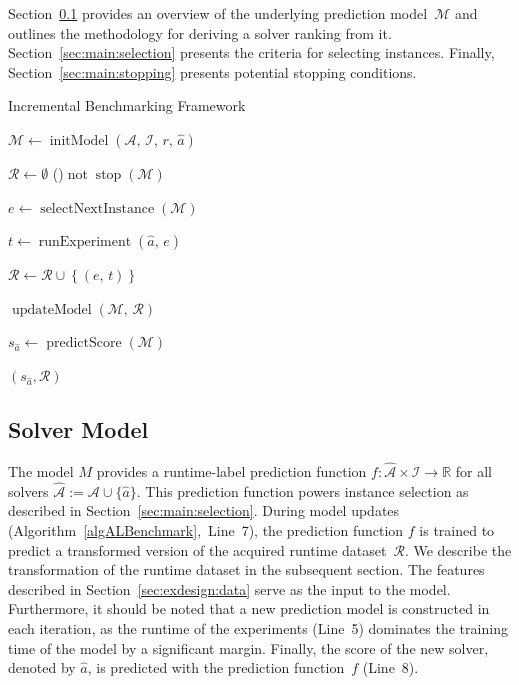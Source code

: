 \documentclass[sn-basic, Numbered]{sn-jnl} %
\begin{document}
Section~\ref{sec:main:model} provides an overview of the underlying prediction model~$\mathcal{M}$ and outlines the methodology for deriving a solver ranking from it.
Section~\ref{sec:main:selection} presents the criteria for selecting instances.
Finally, Section~\ref{sec:main:stopping} presents potential stopping conditions.

\begin{algorithm}[t]
  \caption{Incremental Benchmarking Framework}
  \label{algALBenchmark}


  \BlankLine

  $\mathcal{M} \leftarrow \operatorname{initModel}\left(\mathcal{A},\, \mathcal{I},\, r,\, \hat{a}\right)$ 
  
  \BlankLine
  $\mathcal{R} \leftarrow \emptyset$ \;
  \While(){$\operatorname{not} \operatorname{stop}\left(\mathcal{M}\right)$}{
    $e \leftarrow \operatorname{selectNextInstance}\left(\mathcal{M}\right)$ 

    $t \leftarrow \operatorname{runExperiment}\left(\hat{a},\,  e\right)$  

    $\mathcal{R} \leftarrow \mathcal{R} \cup \left\lbrace (e,\, t) \right\rbrace$

    \BlankLine
    $\operatorname{updateModel}\left(\mathcal{M},\, \mathcal{R}\right)$ 
  }
  $s_{\hat a} \leftarrow \operatorname{predictScore}(\mathcal{M})$ 
  
  \BlankLine
  \Return $(s_{\hat a}, \mathcal{R})$
\end{algorithm}


\subsection{Solver Model}
\label{sec:main:model}

The model $M$ provides a runtime-label prediction function $f : \mathcal{\hat A} \times \mathcal{I} \rightarrow \mathbb{R}$ for all solvers $\mathcal{\hat A} := \mathcal{A} \cup \lbrace \hat a \rbrace$.
This prediction function powers instance selection as described in Section~\ref{sec:main:selection}.
During model updates (Algorithm~\ref{algALBenchmark},~Line~7), the prediction function $f$ is trained to predict a transformed version of the acquired runtime dataset~$\mathcal{R}$.
We describe the transformation of the runtime dataset in the subsequent section.
The features described in Section~\ref{sec:exdesign:data} serve as the input to the model.
Furthermore, it should be noted that a new prediction model is constructed in each iteration, as the runtime of the experiments (Line~5) dominates the training time of the model by a significant margin.
Finally, the score of the new solver, denoted by $\hat a$, is predicted with the prediction function~$f$ (Line~8).
\end{document}
